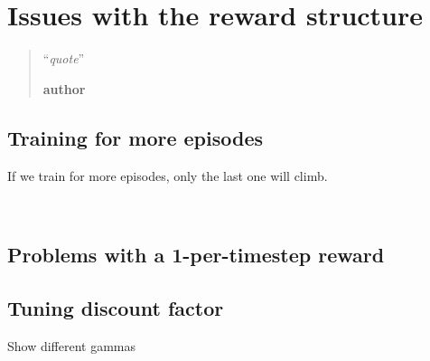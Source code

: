 \chapter{Issues with the reward structure}
\begin{quotation}
\noindent ``\emph{quote}''
\begin{flushright}\textbf{author}\end{flushright}
\end{quotation}


\section{Training for more episodes}
If we train for more episodes, only the last one will climb. 

\begin{figure}
	\centering
	\\
	\caption{}
	\label{fig:20permsLR_training}
\end{figure}

\section{Problems with a 1-per-timestep reward}

\section{Tuning discount factor}
Show different gammas


